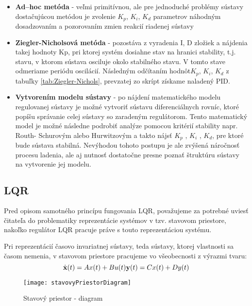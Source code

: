 \begin{itemize}
\item \textbf{Ad–hoc metóda} - veľmi primitívnou, ale pre jednoduché problémy sústavy dostačujúcou metódou je zvolenie $K_p$, $K_i$, $K_d$ parametrov náhodným dosadzovaním a pozorovaním zmien reakcií riadenej sústavy
\item \textbf{Ziegler-Nicholsová metóda} - pozostáva z vyradenia I, D zložiek a nájdenia takej hodnoty Kp, pri ktorej systém dosiahne stav na hranici stability, t.j. stavu, v ktorom sústava osciluje okolo stabilného stavu. V tomto stave odmeriame periódu oscilácií. Následným odčítaním hodnôt$K_p$, $K_i$, $K_d$ z tabuľky \ref{tab:Ziegler-Nichols}, prevzatej zo skrípt\cite{SKRIPTA} získame naladený PID.
\item \textbf{Vytvorením modelu sústavy} - po nájdení matematického modelu regulovanej 	sústavy je možné vytvoriť sústavu diferenciálnych rovníc, ktoré popíšu správanie celej sústavy so zaradeným regulátorom. Tento matematický model je možné následne podrobiť analýze pomocou kritérií stability napr. Routh-	Schurovým alebo Hurwitzovým a takto nájsť  $K_p$ , $K_i$ , $K_d$, pre ktoré bude sústava stabilná. Nevýhodou tohoto postupu je ale zvýšená náročnosť procesu ladenia, ale aj nutnosť dostatočne presne poznať štruktúru sústavy na 	vytvorenie jej modelu.  
\end{itemize}

\subsection{LQR}

Pred opisom samotného princípu fungovania LQR, považujeme za potrebné uviesť čitateľa do problematiky reprezentácie systémov v tzv. stavovom priestore, nakoľko regulátor LQR pracuje práve s touto reprezentáciou systému.

Pri reprezentácií časovo invariatnej sústavy, teda sústavy, ktorej vlastnosti sa časom nemenia, v stavovom priestore pracujeme vo všeobecnosti z výrazmi tvaru:
\begin{equation}
\dot {\textbf{x}}(t) = Ax(t) + Bu(t) \linebreak
\textbf {y}(t) = Cx(t) + Dy(t)  
\end{equation}
\begin{figure}[h]
\centering
\texttt{[image: stavovyPriestorDiagram]}
\caption{Stavový priestor - diagram}
\label{fig:stavovyPriestorDiagram}
\end{figure}

